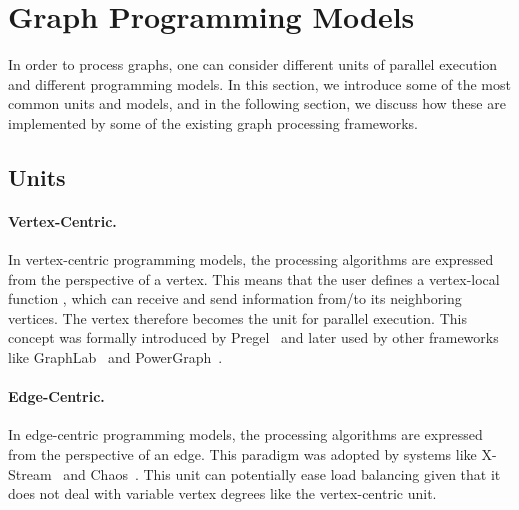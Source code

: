     \section{Graph Programming Models}
    \label{sec:programming_models}

    In order to process graphs, one can consider different units of parallel execution and different programming models. In this section, we introduce some of the most common units and models, and in the following section, we discuss how these are implemented by some of the existing graph processing frameworks. 

    \subsection{Units}

    \paragraph{\textbf{Vertex-Centric}.} In vertex-centric programming models, the processing algorithms are expressed from the perspective of a vertex. This means that the user defines a vertex-local function
    , which can receive and send information from/to its neighboring vertices. 
    The vertex therefore becomes the unit for parallel execution. This concept was formally introduced by Pregel~\cite{paper:pregel} and later used by other frameworks like GraphLab~\cite{paper:graphlab} and PowerGraph~\cite{paper:powergraph}.

    \paragraph{\textbf{Edge-Centric}.} In edge-centric programming models, the processing algorithms are expressed from the perspective of an edge. This paradigm was adopted by systems like X-Stream~\cite{paper:xstream} and Chaos~\cite{paper:chaos}. This unit can potentially ease load balancing given that it does not deal with variable vertex degrees like the vertex-centric unit. 
 
